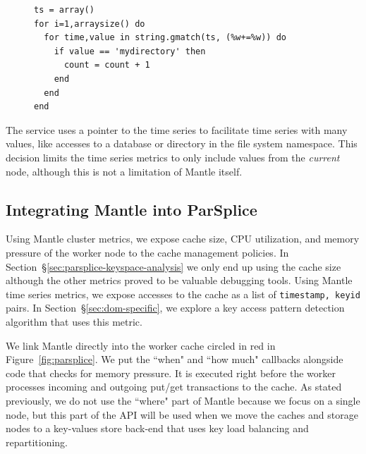 \begin{figure}[h]
\footnotesize
\begin{verbatim}
ts = array()
for i=1,arraysize() do
  for time,value in string.gmatch(ts, (%w+=%w)) do
    if value == 'mydirectory' then
      count = count + 1
    end
  end
end
\end{verbatim}
\end{figure}

The service uses a pointer to the time series to facilitate time series with
many values, like accesses to a database or directory in the file system
namespace. This decision limits the time series metrics to only include values
from the {\it current } node, although this is not a limitation of Mantle
itself.

\subsection{Integrating Mantle into ParSplice}

Using Mantle cluster metrics, we expose cache size, CPU utilization, and memory
pressure of the worker node to the cache management policies. In
Section~\S\ref{sec:parsplice-keyspace-analysis} we only end up using the cache
size although the other metrics proved to be valuable debugging tools. Using
Mantle time series metrics, we expose accesses to the cache as a list of
\texttt{timestamp, keyid} pairs. In Section~\S\ref{sec:dom-specific}, we
explore a key access pattern detection algorithm that uses this metric.

We link Mantle directly into the worker cache circled in red in
Figure~\ref{fig:parsplice}. We put the ``when" and ``how much" callbacks
alongside code that checks for memory pressure. It is executed right before the
worker processes incoming and outgoing put/get transactions to the cache. As
stated previously, we do not use the ``where" part of Mantle because we focus
on a single node, but this part of the API will be used when we move the caches
and storage nodes to a key-values store back-end that uses key load balancing and
repartitioning.
